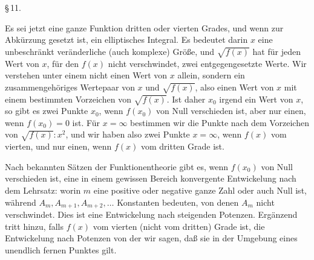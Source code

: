 \begin{center}
\S\,11. \textbf{}
\end{center}
Es sei jetzt
eine ganze Funktion dritten oder vierten Grades, und
wenn zur Abkürzung
gesetzt ist, ein elliptisches Integral. Es bedeutet darin $x$ eine unbeschränkt veränderliche (auch komplexe) Größe, und $\sqrt{f(x)}$ hat für jeden Wert von $x$, für den $f(x)$ nicht verschwindet, zwei entgegengesetzte Werte. Wir verstehen unter einem  nicht einen Wert von $x$ allein, sondern ein zusammengehöriges Wertepaar von $x$ und $\sqrt{f(x)}$, also einen Wert von $x$ mit einem bestimmten Vorzeichen von $\sqrt{f(x)}$. Ist daher $x_0$ irgend ein Wert von $x$, so gibt es zwei Punkte $x_0$, wenn $f(x_0)$ von Null verschieden ist, aber nur einen, wenn $f(x_0) = 0$ ist. Für $x = \infty$ bestimmen wir die Punkte nach dem Vorzeichen von $\sqrt{f(x)}:x^2$, und wir haben also zwei Punkte $x = \infty$, wenn $f(x)$ vom vierten, und nur einen, wenn $f(x)$ vom dritten Grade ist.

Nach bekannten Sätzen der Funktionentheorie gibt es, wenn $f(x_0)$ von Null verschieden ist, eine in einem gewissen Bereich konvergente Entwickelung nach dem  Lehrsatz:
worin $m$ eine positive oder negative ganze Zahl oder auch Null ist, während $A_m, A_{m+1}, A_{m+2}, \dots$ Konstanten bedeuten, von denen $A_m$ nicht verschwindet. Dies ist eine Entwickelung nach steigenden Potenzen. Ergänzend tritt hinzu, falls $f(x)$ vom vierten (nicht vom dritten) Grade ist, die Entwickelung nach  Potenzen
von der wir sagen, daß sie in der Umgebung eines unendlich fernen Punktes gilt.
